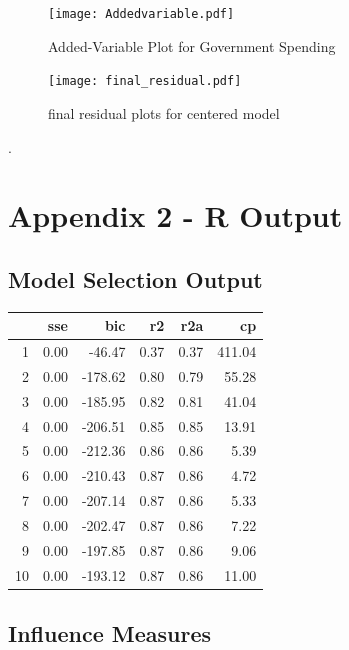\documentclass[12pt]{article}
\begin{document}
\begin{figure}
	\centering
	\texttt{[image: Addedvariable.pdf]}
	\caption{Added-Variable Plot for Government Spending}
	\label{fig:added}
\end{figure}

\begin{figure}
  \centering
    \texttt{[image: final\_residual.pdf]}
  \caption{final residual plots for centered model}
  \label{fig:final_residual}
\end{figure}



\newpage
.
\newpage

\section{Appendix 2 - R Output}

\subsection*{Model Selection Output}
\begin{table}[ht]
	\centering
	\begin{tabular}{rrrrrr}
		\hline
		& sse & bic & r2 & r2a & cp \\
		\hline
		1 & 0.00 & -46.47 & 0.37 & 0.37 & 411.04 \\
		2 & 0.00 & -178.62 & 0.80 & 0.79 & 55.28 \\
		3 & 0.00 & -185.95 & 0.82 & 0.81 & 41.04 \\
		4 & 0.00 & -206.51 & 0.85 & 0.85 & 13.91 \\
		5 & 0.00 & -212.36 & 0.86 & 0.86 & 5.39 \\
		6 & 0.00 & -210.43 & 0.87 & 0.86 & 4.72 \\
		7 & 0.00 & -207.14 & 0.87 & 0.86 & 5.33 \\
		8 & 0.00 & -202.47 & 0.87 & 0.86 & 7.22 \\
		9 & 0.00 & -197.85 & 0.87 & 0.86 & 9.06 \\
		10 & 0.00 & -193.12 & 0.87 & 0.86 & 11.00 \\
		\hline
	\end{tabular}
\end{table}

\subsection{Influence Measures}

\label{influence}
\end{document}
